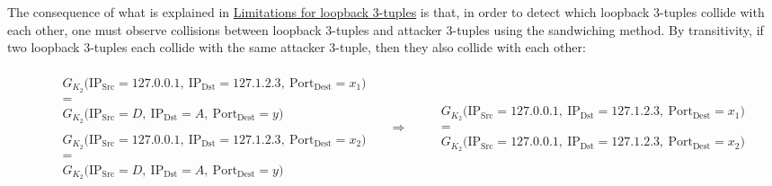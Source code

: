 \documentclass[twocolumn]{report}
\begin{document}
The consequence of what is explained in \hyperlink{limitations}{Limitations for loopback 3-tuples} is that, in order to detect which loopback 3-tuples collide with each other, one must observe \alert{collisions between loopback 3-tuples and attacker 3-tuples} using the sandwiching method. By transitivity, if two loopback 3-tuples each collide with the same attacker 3-tuple, then they also collide with each other:
\vspace{-0.6cm}
\begin{center}
	\begin{adjustbox}{max width=\columnwidth}
		\begin{minipage}{0.85\textwidth}
			\[
				\begin{aligned}
					 &
					\begin{aligned}
						 & \begin{array}{c}
							   G_{K_2}\bigl(\text{IP}_{\text{Src}} = 127.0.0.1,\ \text{IP}_{\text{Dst}} = 127.1.2.3,\ \text{Port}_{\text{Dest}} = x_1 \bigr) \\[0.3em]
							   =                                                                                                                             \\[0.3em]
							   G_{K_2}\bigl(\text{IP}_{\text{Src}} = D,\ \text{IP}_{\text{Dst}} = A,\ \text{Port}_{\text{Dest}} = y \bigr)
						   \end{array}
						\\[1em]
						 & \begin{array}{c}
							   G_{K_2}\bigl(\text{IP}_{\text{Src}} = 127.0.0.1,\ \text{IP}_{\text{Dst}} = 127.1.2.3,\ \text{Port}_{\text{Dest}} = x_2 \bigr) \\[0.3em]
							   =                                                                                                                             \\[0.3em]
							   G_{K_2}\bigl(\text{IP}_{\text{Src}} = D,\ \text{IP}_{\text{Dst}} = A,\ \text{Port}_{\text{Dest}} = y \bigr)
						   \end{array}
					\end{aligned}
					\quad \Longrightarrow \quad
					\begin{aligned}
						 & \begin{array}{c}
							   G_{K_2}\bigl(\text{IP}_{\text{Src}} = 127.0.0.1,\ \text{IP}_{\text{Dst}} = 127.1.2.3,\ \text{Port}_{\text{Dest}} = x_1 \bigr) \\[0.3em]
							   =                                                                                                                             \\[0.3em]
							   G_{K_2}\bigl(\text{IP}_{\text{Src}} = 127.0.0.1,\ \text{IP}_{\text{Dst}} = 127.1.2.3,\ \text{Port}_{\text{Dest}} = x_2 \bigr)
						   \end{array}
					\end{aligned}
				\end{aligned}
			\]
		\end{minipage}
	\end{adjustbox}
\end{center}
\end{document}
